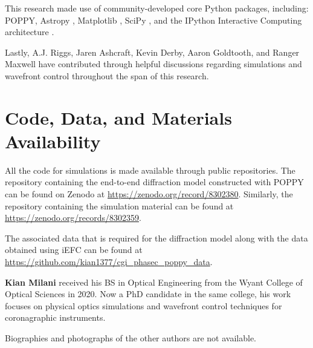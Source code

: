 \documentclass[12pt]{spieman}  %
\begin{document}
\begin{spacing}{2}
This research made use of community-developed core Python packages, including: POPPY\cite{perrin-poppy-2017}, Astropy \cite{the_astropy_collaboration_astropy_2013}, Matplotlib \cite{hunter_matplotlib_2007}, SciPy \cite{jones_scipy_2001}, and
the IPython Interactive Computing architecture \cite{perez_ipython_2007}.

Lastly, A.J. Riggs, Jaren Ashcraft, Kevin Derby, Aaron Goldtooth, and Ranger Maxwell have contributed through helpful discussions regarding simulations and wavefront control throughout the span of this research. 

\section{Code, Data, and Materials Availability}

All the code for simulations is made available through public repositories. The repository containing the end-to-end diffraction model constructed with POPPY can be found on Zenodo at \href{https://zenodo.org/record/8302380}{https://zenodo.org/record/8302380}\cite{milani-cgi-phasec-poppy}. Similarly, the repository containing the simulation material can be found at \href{https://zenodo.org/records/8302359}{https://zenodo.org/records/8302359}\cite{milani-roman-cgi-iefc}. 

The associated data that is required for the diffraction model along with the data obtained using iEFC can be found at \href{https://github.com/kian1377/cgi_phasec_poppy_data}{https://github.com/kian1377/cgi\_phasec\_poppy\_data}. 


\vspace{2ex}\noindent\textbf{Kian Milani} received his BS in Optical Engineering from the Wyant College of Optical Sciences in 2020. Now a PhD candidate in the same college, his work focuses on physical optics simulations and wavefront control techniques for coronagraphic instruments. 

\vspace{1ex}
\noindent Biographies and photographs of the other authors are not available.

\listoffigures
\listoftables

\end{spacing}
\end{document}
